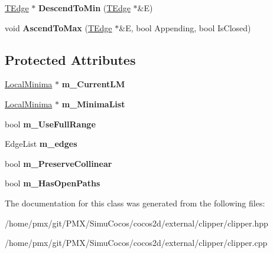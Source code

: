 \begin{DoxyCompactItemize}
\item 
\mbox{\label{classClipperLib_1_1ClipperBase_a13086e8d650edc1a024813d3a8469120}} 
\hyperlink{structClipperLib_1_1TEdge}{T\+Edge} $\ast$ {\bfseries Descend\+To\+Min} (\hyperlink{structClipperLib_1_1TEdge}{T\+Edge} $\ast$\&E)
\item 
\mbox{\label{classClipperLib_1_1ClipperBase_afafbf0dafffb5ad6f5a5c30dbed6378f}} 
void {\bfseries Ascend\+To\+Max} (\hyperlink{structClipperLib_1_1TEdge}{T\+Edge} $\ast$\&E, bool Appending, bool Is\+Closed)
\end{DoxyCompactItemize}
\subsection*{Protected Attributes}
\begin{DoxyCompactItemize}
\item 
\mbox{\label{classClipperLib_1_1ClipperBase_a9ef2d731d216d02141ccc2295d99ec3d}} 
\hyperlink{structClipperLib_1_1LocalMinima}{Local\+Minima} $\ast$ {\bfseries m\+\_\+\+Current\+LM}
\item 
\mbox{\label{classClipperLib_1_1ClipperBase_a858a4e2d2921d3949ddbf3acfa6fe1df}} 
\hyperlink{structClipperLib_1_1LocalMinima}{Local\+Minima} $\ast$ {\bfseries m\+\_\+\+Minima\+List}
\item 
\mbox{\label{classClipperLib_1_1ClipperBase_aea11d183617adc12d7ba2b84533f7f45}} 
bool {\bfseries m\+\_\+\+Use\+Full\+Range}
\item 
\mbox{\label{classClipperLib_1_1ClipperBase_a8bfc007c0c0afd4e9d252dac0ef5daa0}} 
Edge\+List {\bfseries m\+\_\+edges}
\item 
\mbox{\label{classClipperLib_1_1ClipperBase_aad4ca0f2a16a6fb466036b36cc5ff638}} 
bool {\bfseries m\+\_\+\+Preserve\+Collinear}
\item 
\mbox{\label{classClipperLib_1_1ClipperBase_aa2508f5b2a599294c359271506441fbd}} 
bool {\bfseries m\+\_\+\+Has\+Open\+Paths}
\end{DoxyCompactItemize}


The documentation for this class was generated from the following files\+:\begin{DoxyCompactItemize}
\item 
/home/pmx/git/\+P\+M\+X/\+Simu\+Cocos/cocos2d/external/clipper/clipper.\+hpp\item 
/home/pmx/git/\+P\+M\+X/\+Simu\+Cocos/cocos2d/external/clipper/clipper.\+cpp\end{DoxyCompactItemize}
